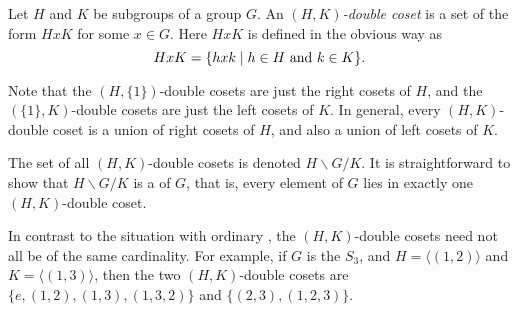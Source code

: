 \documentclass[12pt]{article}
\def\genby#1{\langle#1\rangle}
\begin{document}

Let $H$ and $K$ be subgroups of a group $G$.
An \emph{$(H,K)$-double coset} is a set of the form $HxK$ for some $x\in G$.
Here $HxK$ is defined in the obvious way as
\[
  HxK = \{ hxk \mid h\in H \hbox{ and } k\in K \}.
\]

Note that the $(H,\{1\})$-double cosets are just the right cosets of $H$,
and the $(\{1\},K)$-double cosets are just the left cosets of $K$.
In general, every $(H,K)$-double coset is a union of right cosets of $H$,
and also a union of left cosets of $K$.

The set of all $(H,K)$-double cosets is denoted $H\backslash G/K$.
It is straightforward to show that $H\backslash G/K$ is a  of $G$,
that is, every element of $G$ lies in exactly one $(H,K)$-double coset.

In contrast to the situation with ordinary ,
the $(H,K)$-double cosets need not all be of the same cardinality.
For example, if $G$ is the  $S_3$,
and $H=\genby{(1,2)}$ and $K=\genby{(1,3)}$,
then the two $(H,K)$-double cosets
are $\{e,(1,2),(1,3),(1,3,2)\}$ and $\{(2,3),(1,2,3)\}$.

\end{document}
